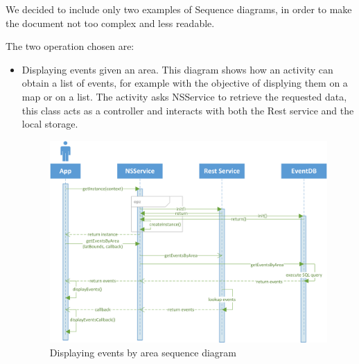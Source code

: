 \documentclass[a4paper]{scrreprt}
\begin{document}
\bigskip We decided to include only two examples of Sequence diagrams, in order to make the document not too complex and less readable.

\bigskip The two operation chosen are:
\begin{itemize}
	\item Displaying events given an area. This diagram shows how an activity can obtain a list of events, for example with the objective of displying them on a map or on a list. The activity asks NSService to retrieve the requested data, this class acts as a controller and interacts with both the Rest service and the local storage.
	\bigskip\begin{figure}[H]
		\centering
		\includegraphics[width=\textwidth]{diagrams/sequence/sequence_diag_eventbyarea.png}
		\caption{Displaying events by area sequence diagram}
	\end{figure}


\end{itemize}
\end{document}
